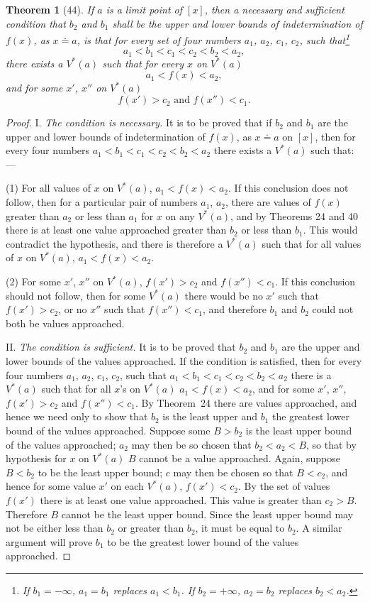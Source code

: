 \documentclass[a4paper,12pt]{book}[2004/02/16]
\providecommand{\hyperlink}[2]{#2}
\providecommand{\hypertarget}[2]{#2}
\theoremstyle{ilemma}
\theoremstyle{itheorem}
\newtheorem{theorem}{Theorem}
\theoremstyle{iother}
\theoremstyle{icorollary}
\theoremstyle{numcorollary}
\theoremstyle{idefinition}
\begin{document}
\begin{theorem}[44]\hypertarget{thm44}{}
If $a$ is a limit point of $[x]$, then a necessary and sufficient
condition that $b_2$ and $b_1$ shall be the upper and lower bounds of
indetermination of $f(x)$, as $x\doteq a$, is that for every set of
four numbers $a_1$, $a_2$, $c_1$, $c_2$, such that\footnote{%
    If $b_1 =-\infty$, $a_1=b_1$ replaces $a_1<b_1$. If $b_2 =
    +\infty$, $a_2=b_2$ replaces $b_2<a_2$.}
\[
  a_1<b_1<c_1<c_2<b_2<a_2,
\]
there exists a $V^*(a)$ such that for every $x$ on $V^*(a)$
\[
  a_1<f(x)<a_2,
\]
and for some $x'$, $x''$ on $V^*(a)$
\[
  f(x')>c_2 \text{ and } f(x'')<c_1.
\]
\end{theorem}

\begin{proof}
I. \textit{The condition is necessary.} It is to be proved that if
$b_2$ and $b_1$ are the upper and lower bounds of indetermination of
$f(x)$, as $x\doteq a$ on $[x]$, then for every four numbers
$a_1<b_1<c_1<c_2<b_2<a_2$ there exists a $V^*(a)$ such that:---

(1) For all values of $x$ on $V^*(a)$, $a_1<f(x)<a_2$. If this
conclusion does not follow, then for a particular pair of numbers
$a_1$, $a_2$, there are values of $f(x)$ greater than $a_2$ or less
than $a_1$ for $x$ on any $V^*(a)$, and by Theorems \hyperlink{thm24}{24} and \hyperlink{thm40}{40} there is
at least one value approached greater than $b_2$ or less than
$b_1$. This would contradict the hypothesis, and there is therefore a
$V^*(a)$ such that for all values of $x$ on $V^*(a)$, $a_1<f(x)<a_2$.

(2) For some $x'$, $x''$ on $V^*(a)$, $f(x')>c_2$ and $f(x'')<c_1$. If
this conclusion should not follow, then for some $V^*(a)$ there would
be no $x'$ such that $f(x') >c_2$, or no $x''$ such that $f(x'')<c_1$,
and therefore $b_1$ and $b_2$ could not both be values approached.

II. \textit{The condition is sufficient.} It is to be proved that
$b_2$ and $b_1$ are the upper and lower bounds of the values
approached.  If the condition is satisfied, then for every four
numbers $a_1$, $a_2$, $c_1$, $c_2$, such that
$a_1<b_1<c_1<c_2<b_2<a_2$ there is a $V^*(a)$ such that for all $x$'s
on $V^*(a)$ $a_1<f(x)<a_2$, and for some $x'$, $x'',$ $f(x')>c_2$ and
$f(x'')<c_1$. By Theorem~\hyperlink{thm24}{24} there are values approached, and hence we
need only to show that $b_2$ is the least upper and $b_1$ the greatest
lower bound of the values approached.  Suppose some $B>b_2$ is the
least upper bound of the values approached; $a_2$ may then be so
chosen that $b_2 < a_2 < B$, so that by hypothesis for $x$ on $V^*(a)$
$B$ cannot be a value approached.  Again, suppose $B<b_2$ to be the
least upper bound; $c$ may then be chosen so that $B<c_2$, and hence
for some value $x'$ on each $V^*(a)$, $f(x')<c_2$. By the set of
values $f(x')$ there is at least one value approached. This value is
greater than $c_2>B$.  Therefore $B$ cannot be the least upper
bound. Since the least upper bound may not be either less than $b_2$
or greater than $b_2$, it must be equal to $b_2$. A similar argument
will prove $b_1$ to be the greatest lower bound of the values
approached.
\end{proof}
\end{document}
